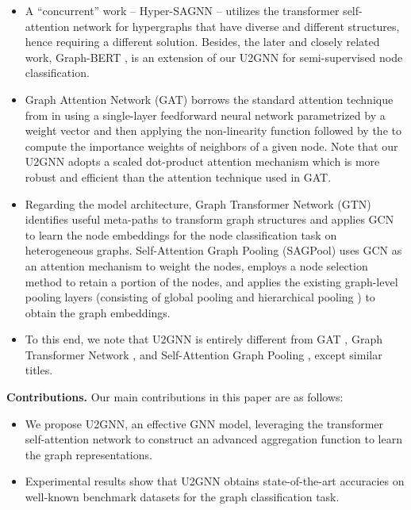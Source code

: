 \documentclass[twoside,leqno,twocolumn]{article}
\newcommand{\citep}{\cite}
\begin{document}
\begin{itemize}

\item A ``concurrent'' work -- Hyper-{SAGNN} \citep{zhang2020hypersagnn} -- utilizes the transformer self-attention network for hypergraphs that have diverse and different structures, hence requiring a different solution.
Besides, the {later} and closely related work, Graph-BERT \citep{zhang2020graph}, is an extension of our U2GNN for semi-supervised node classification.

\item Graph Attention Network (GAT) \citep{velickovic2018graph} borrows the standard attention technique from \citep{bahdanau2014neural} in using a single-layer feedforward neural network parametrized by a weight vector and then applying the non-linearity function followed by the  to compute the importance weights of neighbors of a given node.
Note that our U2GNN adopts a scaled dot-product attention mechanism which is more robust and efficient than the attention technique used in GAT.

\item Regarding the model architecture, Graph Transformer Network (GTN) \citep{yun2019graph} identifies useful meta-paths \citep{wang2019heterogeneous} to transform graph structures and applies GCN \citep{kipf2017semi} to learn the node embeddings for the node classification task on heterogeneous graphs. 
Self-Attention Graph Pooling (SAGPool) \citep{Lee2019SelfAttentionGP} uses GCN as an attention mechanism to weight the nodes, employs a node selection method \citep{gao2019graph} to retain a portion of the nodes, and applies the existing graph-level  pooling layers (consisting of global pooling \citep{zhang2018end} and hierarchical pooling \citep{cangea2018towards}) to obtain the graph embeddings.

\item To this end, we note that U2GNN is entirely different from GAT \citep{velickovic2018graph}, Graph Transformer Network \citep{yun2019graph}, and Self-Attention Graph Pooling \citep{Lee2019SelfAttentionGP}, except similar titles.

\end{itemize}

\noindent \textbf{Contributions.} 
Our main contributions in this paper are as follows:
\begin{itemize}


\item We propose U2GNN, an effective GNN model, leveraging the transformer self-attention network to construct an advanced aggregation function to learn the graph representations.

\item Experimental results show that U2GNN obtains state-of-the-art accuracies on well-known benchmark datasets for the graph classification task.

\end{itemize}
\end{document}
